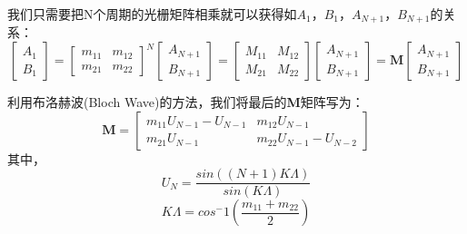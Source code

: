 我们只需要把N个周期的光栅矩阵相乘就可以获得如$A_1$，$B_1$，$A_{N+1}$，$B_{N+1}$的关系：
\begin{equation}
\label{Equ:ring_TMM_multi}
\begin{bmatrix}
A_{1}\\
B_{1}
\end{bmatrix} 
=
\begin{bmatrix}
m_{11} & m_{12}\\
m_{21} & m_{22}
\end{bmatrix}^N
\begin{bmatrix}
A_{N+1}\\
B_{N+1}
\end{bmatrix}
=
\begin{bmatrix}
M_{11} & M_{12}\\
M_{21} & M_{22}
\end{bmatrix}
\begin{bmatrix}
A_{N+1}\\
B_{N+1}
\end{bmatrix}
=
\textbf{M}
\begin{bmatrix}
A_{N+1}\\
B_{N+1}
\end{bmatrix}
\end{equation}

利用布洛赫波(Bloch Wave)的方法\cite{yariv2006photonics}，我们将最后的\textbf{M}矩阵写为：
\begin{equation}
\label{Equ:ring_bloch}
\textbf{M}
=
\begin{bmatrix}
m_{11}U_{N-1} - U_{N-1}& m_{12}U_{N-1}\\
m_{21}U_{N-1} & m_{22}U_{N-1}-U_{N-2}
\end{bmatrix}
\end{equation}
其中，
\begin{equation}
\label{Equ:UN}
U_N = \frac{sin((N+1)K\Lambda)}{sin(K\Lambda)}
\end{equation}
\begin{equation}
\label{Equ:KLambda}
K\Lambda = cos^-1\left(\frac{m_{11}+m_{22}}{2}\right)
\end{equation}

